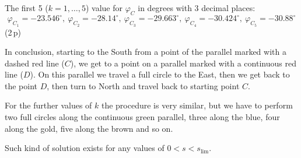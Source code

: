 \begin{description}
  The first 5 ($k = 1, \ldots, 5$) value for $\varphi_C$ in degrees with 3
  decimal places:
  \[
    \varphi_{C_1} = -23.546^\circ,\ \varphi_{C_2} = -28.14^\circ,\
    \varphi_{C_3} = -29.663^\circ,\ \varphi_{C_4} = -30.424^\circ,\
    \varphi_{C_5} = -30.88^\circ
  \]
  \hfill(2\,p)

  In conclusion, starting to the South from a point of the parallel marked with
  a dashed red line ($C$), we get to a point on a parallel marked with a
  continuous red line ($D$). On this parallel we travel a full circle to the
  East, then we get back to the point $D$, then turn to North and travel back
  to starting point $C$.

  For the further values of $k$ the procedure is very similar, but we have to
  perform two full circles along the continuous green parallel, three along the
  blue, four along the gold, five along the brown and so on.

  Such kind of solution exists for any values of $0 < s < s_{\lim}$.

\end{description}
